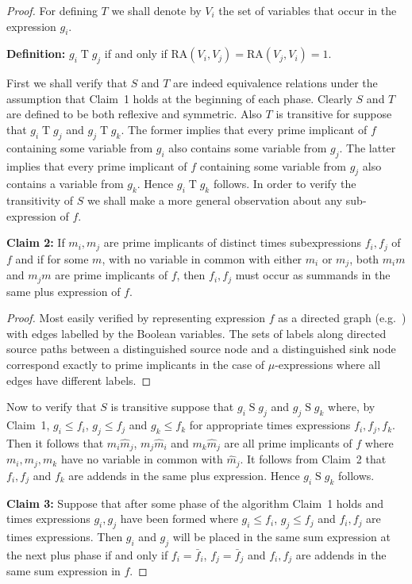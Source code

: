 \begin{proof}
For defining $T$ we shall denote by $V_i$ the set of variables that occur in the expression $g_i$.

\textbf{Definition:} $g_i \mathrel{T} g_j$ if and only if $\text{RA}(V_i, V_j) = \text{RA}(V_j, V_i) = 1$.

First we shall verify that $S$ and $T$ are indeed equivalence relations under the assumption that Claim~1 holds at the beginning of each phase. Clearly $S$ and $T$ are defined to be both reflexive and symmetric. Also $T$ is transitive for suppose that $g_i \mathrel{T} g_j$ and $g_j \mathrel{T} g_k$. The former implies that every prime implicant of $f$ containing some variable from $g_i$ also contains some variable from $g_j$. The latter implies that every prime implicant of $f$ containing some variable from $g_j$ also contains a variable from $g_k$. Hence $g_i \mathrel{T} g_k$ follows. In order to verify the transitivity of $S$ we shall make a more general observation about any sub-expression of $f$.

\textbf{Claim 2:} If $m_i, m_j$ are prime implicants of distinct times subexpressions $f_i, f_j$ of $f$ and if for some $m$, with no variable in common with either $m_i$ or $m_j$, both $m_i m$ and $m_j m$ are prime implicants of $f$, then $f_i, f_j$ must occur as summands in the same plus expression of $f$.

\begin{proof}
Most easily verified by representing expression $f$ as a directed graph (e.g.\ \cite{7}) with edges labelled by the Boolean variables. The sets of labels along directed source paths between a distinguished source node and a distinguished sink node correspond exactly to prime implicants in the case of $\mu$-expressions where all edges have different labels. \qedhere
\end{proof}

Now to verify that $S$ is transitive suppose that $g_i \mathrel{S} g_j$ and $g_j \mathrel{S} g_k$ where, by Claim~1, $g_i \leq f_i$, $g_j \leq f_j$ and $g_k \leq f_k$ for appropriate times expressions $f_i, f_j, f_k$. Then it follows that $m_i \hat{m}_j$, $m_j \hat{m}_i$ and $m_k \hat{m}_j$ are all prime implicants of $f$ where $m_i, m_j, m_k$ have no variable in common with $\hat{m}_j$. It follows from Claim~2 that $f_i, f_j$ and $f_k$ are addends in the same plus expression. Hence $g_i \mathrel{S} g_k$ follows.

\textbf{Claim 3:} Suppose that after some phase of the algorithm Claim~1 holds and times expressions $g_i, g_j$ have been formed where $g_i \leq f_i$, $g_j \leq f_j$ and $f_i, f_j$ are times expressions. Then $g_i$ and $g_j$ will be placed in the same sum expression at the next plus phase if and only if $f_i = \bar{f}_i$, $f_j = \bar{f}_j$ and $f_i, f_j$ are addends in the same sum expression in $f$.


\end{proof}
